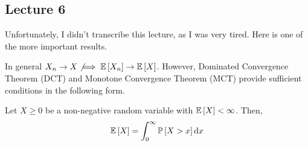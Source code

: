 \subsection{Lecture 6}

Unfortunately, I didn't transcribe this lecture, as I was very tired.
Here is one of the more important results.

In general $X_n \to X \not\implies \mathbb{E}\left[ X_n \right] \to \mathbb{E}\left[ X \right]$. However, Dominated Convergence Theorem (DCT) and
Monotone Convergence Theorem (MCT) provide sufficient conditions in the following form.

\begin{theorem}
    Let $X \geq 0$ be a non-negative random variable with $\mathbb{E}\left[ X \right] < \infty$. Then,
    \[ \mathbb{E}\left[ X \right] = \int_0^{\infty} \mathbb{P}\left[ X > x \right] \dd{x} \]
\end{theorem}